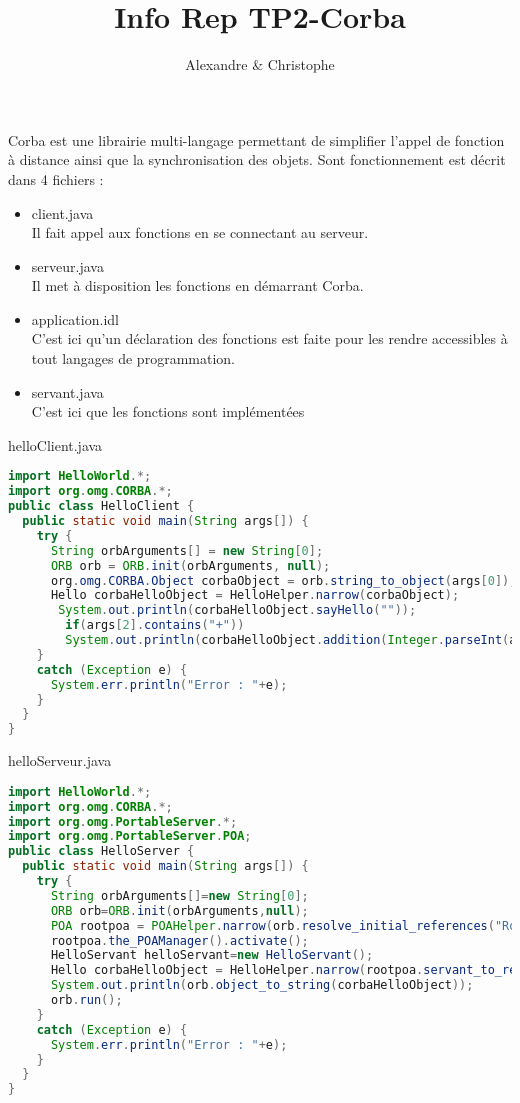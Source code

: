 \documentclass{article}
\title{Info Rep TP2-Corba}
\author{Alexandre \bsc{Brehmer} \& Christophe \bsc{Cluizel}}
\begin{document}
\maketitle
Corba est une librairie multi-langage permettant de simplifier l'appel de fonction à distance ainsi que la synchronisation des objets. Sont fonctionnement est décrit dans 4 fichiers :
\begin{itemize}
\item client.java\\
	Il fait appel aux fonctions en se connectant au serveur.
\item serveur.java\\
	Il met à disposition les fonctions en démarrant Corba.
\item application.idl\\
	C'est ici qu'un déclaration des fonctions est faite pour les rendre accessibles à tout langages de programmation.
\item servant.java\\
	C'est ici que les fonctions sont implémentées
\end{itemize}

helloClient.java
\begin{lstlisting}[language=JAVA]
import HelloWorld.*;
import org.omg.CORBA.*;
public class HelloClient {
  public static void main(String args[]) {
    try {
      String orbArguments[] = new String[0];
      ORB orb = ORB.init(orbArguments, null);
      org.omg.CORBA.Object corbaObject = orb.string_to_object(args[0]);
      Hello corbaHelloObject = HelloHelper.narrow(corbaObject);
       System.out.println(corbaHelloObject.sayHello(""));
        if(args[2].contains("+"))
		System.out.println(corbaHelloObject.addition(Integer.parseInt(args[1]),Integer.parseInt(args[3])));
    }
    catch (Exception e) {
      System.err.println("Error : "+e);
    }
  }
}
\end{lstlisting}

helloServeur.java
\begin{lstlisting}[language=JAVA]
import HelloWorld.*;
import org.omg.CORBA.*;
import org.omg.PortableServer.*;
import org.omg.PortableServer.POA;
public class HelloServer {
  public static void main(String args[]) {
    try {
      String orbArguments[]=new String[0];
      ORB orb=ORB.init(orbArguments,null);
      POA rootpoa = POAHelper.narrow(orb.resolve_initial_references("RootPOA"));
      rootpoa.the_POAManager().activate();
      HelloServant helloServant=new HelloServant();
      Hello corbaHelloObject = HelloHelper.narrow(rootpoa.servant_to_reference(helloServant));
      System.out.println(orb.object_to_string(corbaHelloObject));
      orb.run();
    }
    catch (Exception e) {
      System.err.println("Error : "+e);
    }
  }
}
\end{lstlisting}
\end{document}
